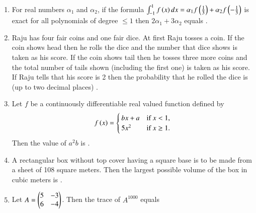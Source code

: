\documentclass[a4paper,10pt]{article}
\begin{document}
\begin{enumerate}
    \item For real numbers $\alpha_1$ and $\alpha_2$, if the formula $\int_{-1}^{1} f\left(x\right) dx = \alpha_1 f\left(\frac{1}{3}\right) + \alpha_2 f\left(-\frac{1}{3}\right)$ is exact for all polynomials of degree $\le 1$ then $2\alpha_1 + 3\alpha_2$ equals \underline{\hspace{2cm}}.
    \hfill{}

    \item Raju has four fair coins and one fair dice. At first Raju tosses a coin. If the coin shows head then he rolls the dice and the number that dice shows is taken as his score. If the coin shows tail then he tosses three more coins and the total number of tails shown (including the first one) is taken as his score. If Raju tells that his score is 2 then the probability that he rolled the dice is (up to two decimal places) \underline{\hspace{2cm}}.
    \hfill{}

    \item Let $f$ be a continuously differentiable real valued function defined by
    \begin{align*}
        f\left(x\right) = 
        \begin{cases}
            bx+a & \text{if } x < 1, \\
            5x^2 & \text{if } x \ge 1.
        \end{cases}
    \end{align*}
    Then the value of $a^2b$ is \underline{\hspace{2cm}}.
    \hfill{}

    \item A rectangular box without top cover having a square base is to be made from a sheet of 108 square meters. Then the largest possible volume of the box in cubic meters is \underline{\hspace{2cm}}.
    \hfill{}

    \item Let $A = \begin{pmatrix}5 & -3 \\ 6 & -4\end{pmatrix}$. Then the trace of $A^{1000}$ equals
    \hfill{}
    \begin{enumerate}[label=\Alph*)]
    \end{enumerate}


\end{enumerate}
\end{document}
